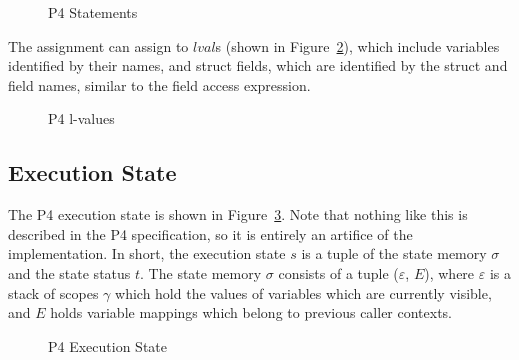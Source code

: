 \documentclass[UTF8]{article}
\begin{document}
\begin{figure}[h!]
\centering\ottgrammartabular{
\ottstmt\ottafterlastrule
}
\caption{P4 Statements}
\label{fig:stmt}
\end{figure}

The assignment can assign to $lval$s (shown in Figure~\ref{fig:lval}), which include variables identified by their names, and struct fields, which are identified by the struct and field names, similar to the field access expression.

\begin{figure}[h!]
\centering\ottgrammartabular{
\ottlval\ottafterlastrule
}
\caption{P4 l-values}
\label{fig:lval}
\end{figure}

\newpage
\newcommand{\exstate}{\ensuremath{s}}
\newcommand{\scope}{\ensuremath{\mathit{scope}}}
\newcommand{\stacks}{\ensuremath{\sigma}}
\newcommand{\currsf}{\ensuremath{\varepsilon}}
\newcommand{\gscope}{\ensuremath{{\gamma}_G}}
\newcommand{\escope}{\ensuremath{{\gamma}_{\emptyset}}}
\newcommand{\cstack}{E}
\newcommand{\status}{\ensuremath{t}}
\newcommand{\running}{\textbf{R}}
\newcommand{\returnst}[1]{\ensuremath{\textbf{Ret}\,\,#1}}
\newcommand{\accept}{\textbf{Accept}}
\newcommand{\reject}[1]{\textbf{Reject} #1}
\newcommand{\trans}[1]{\textbf{Trans} #1}
\newcommand{\sterr}{\ensuremath{\bot}}
\newcommand{\pfin}{\ensuremath{p_{\mathrm{fin}}}}
\subsection{Execution State}

The P4 execution state is shown in Figure~\ref{fig:status}. Note that nothing like this is described in the P4 specification, so it is entirely an artifice of the \pfott{} implementation. In short, the execution state \exstate{} is a tuple of the state memory \stacks{} and the state status \status{}. The state memory $\stacks{}$ consists of a tuple ($\currsf$, $\cstack$), where $\currsf$ is a stack of scopes $\gamma$ which hold the values of variables which are currently visible, and $\cstack$ holds variable mappings which belong to previous caller contexts.

\begin{figure}[h!]
\centering\ottgrammartabular{
\ottstatus\ottinterrule
\ottstate\ottafterlastrule
}
\caption{P4 Execution State}
\label{fig:status}
\end{figure}
\end{document}
